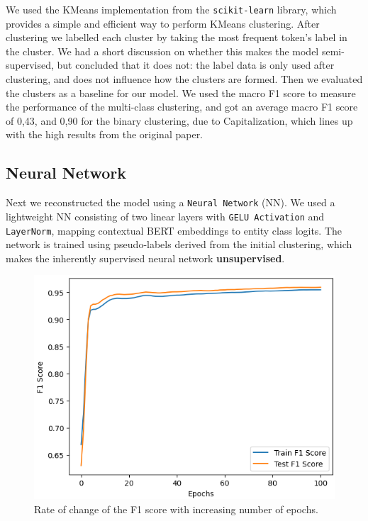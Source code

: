 \documentclass[11pt]{article}
\begin{document}
We used the KMeans implementation from the \texttt{scikit-learn} library, which provides a simple and efficient way to perform KMeans clustering.
After clustering we labelled each cluster by taking the most frequent token's label in the cluster. We had a short discussion on whether 
this makes the model semi-supervised, but concluded that it does not: the label data is only used after clustering, and does not influence
how the clusters are formed. Then we evaluated the clusters as a baseline for our model. We used the macro F1 score to measure the performance of
the multi-class clustering, and got an average macro F1 score of 0,43, and 0,90 for the binary clustering, due to Capitalization, which
lines up with the high results from the original paper.

\subsection{Neural Network}

Next we reconstructed the model using a \texttt{Neural Network} (NN). We used a lightweight NN consisting of two linear layers with
\texttt{GELU Activation} and \texttt{LayerNorm}, mapping contextual BERT embeddings to entity class logits. The network is trained using
pseudo-labels derived from the initial clustering, which makes the inherently supervised neural network \textbf{unsupervised}.

\begin{figure}[H]
  \includegraphics[width=\columnwidth]{F1-Epochs.png}
  \caption{Rate of change of the F1 score with increasing number of epochs.}
  \label{fig:F1-Epochs}
\end{figure}
\end{document}
